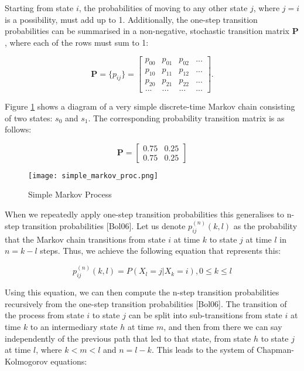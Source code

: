 \documentclass[a4paper,11pt,titlepage]{article}
\begin{document}
Starting from state $i$, the probabilities of moving to any other state $j$, where $j=i$ is a possibility, must add up to 1. Additionally, the one-step transition probabilities can be summarised in a non-negative, stochastic transition matrix $\mathbf{P}$, where each of the rows must sum to 1:

\begin{equation}
    \mathbf{P} = \{p_{ij}\} = 
     \begin{bmatrix}
    p_{00} & p_{01} & p_{02} & ... \\
    p_{10} & p_{11} & p_{12} & ... \\
    p_{20} & p_{21} & p_{22} & ...\\
    ... & ... & ... & ... \end{bmatrix}.
\end{equation}

Figure \ref{fig:simplemarkov} shows a diagram of a very simple discrete-time Markov chain consisting of two states: $s_0$ and $s_1$. The corresponding probability transition matrix is as follows: 

\[ \mathbf{P} =  \begin{bmatrix}
0.75 & 0.25 \\
0.75 & 0.25 \end{bmatrix}\]


\begin{figure}[h!]
\texttt{[image: simple\_markov\_proc.png]}
\caption{Simple Markov Process}
\label{fig:simplemarkov}
\end{figure}

When we repeatedly apply one-step transition probabilities this generalises to n-step transition probabilities [Bol06]. Let us denote $p_{ij}^{(n)}(k,l)$ as the probability that the Markov chain transitions from state $i$ at time $k$ to state $j$ at time $l$ in $n = k-l$ steps. Thus, we achieve the following equation that represents this: 

\begin{equation}
    p_{ij}^{(n)}(k,l)=P(X_l=j|X_k=i), 0 \leqslant k \leqslant l
\end{equation}

Using this equation, we can then compute the n-step transition probabilities recursively from the one-step transition probabilities [Bol06]. The transition of the process from state $i$ to state $j$ can be split into sub-transitions from state $i$ at time $k$ to an intermediary state $h$ at time $m$, and then from there we can say independently of the previous path that led to that state, from state $h$ to state $j$ at time $l$, where $k < m < l$ and $n = l-k$. This leads to the system of Chapman-Kolmogorov equations: 
\end{document}
